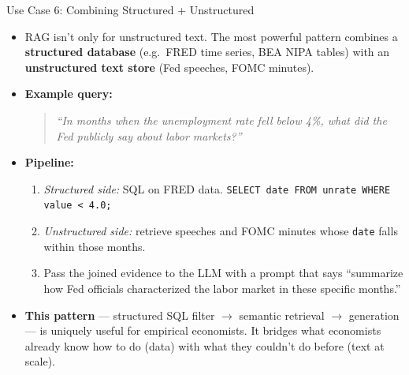\documentclass[10pt,english,aspectratio=169]{beamer}
\begin{document}
\begin{frame}{Use Case 6: Combining Structured + Unstructured}
\begin{itemize}
\item RAG isn't only for unstructured text. The most powerful pattern combines a \textbf{structured database} (e.g.\ FRED time series, BEA NIPA tables) with an \textbf{unstructured text store} (Fed speeches, FOMC minutes).

\medskip
\item \textbf{Example query:}
\begin{quote}
\small\itshape
``In months when the unemployment rate fell below 4\%, what did the Fed publicly say about labor markets?''
\end{quote}

\medskip
\item \textbf{Pipeline:}
\begin{enumerate}
    \item \emph{Structured side:} SQL on FRED data. \texttt{SELECT date FROM unrate WHERE value < 4.0;}
    \item \emph{Unstructured side:} retrieve speeches and FOMC minutes whose \texttt{date} falls within those months.
    \item Pass the joined evidence to the LLM with a prompt that says ``summarize how Fed officials characterized the labor market in these specific months.''
\end{enumerate}

\medskip
\item \textbf{This pattern} --- structured SQL filter $\to$ semantic retrieval $\to$ generation --- is uniquely useful for empirical economists. It bridges what economists already know how to do (data) with what they couldn't do before (text at scale).
\end{itemize}
\end{frame}
\end{document}
